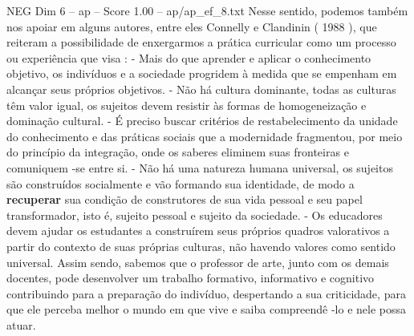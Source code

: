 \begin{textsample}{NEG Dim 6 – ap – Score 1.00 – ap/ap\_ef\_8.txt}
Nesse sentido, podemos também nos apoiar em alguns autores, entre eles Connelly e Clandinin ( 1988 ), que reiteram a possibilidade de enxergarmos a prática curricular como um processo ou experiência que visa : - Mais do que aprender e aplicar o conhecimento objetivo, os indivíduos e a sociedade progridem à medida que se empenham em alcançar seus próprios objetivos. - Não há cultura dominante, todas as culturas têm valor igual, os sujeitos devem resistir às formas de homogeneização e dominação cultural. - É preciso buscar critérios de restabelecimento da unidade do conhecimento e das práticas sociais que a modernidade fragmentou, por meio do princípio da integração, onde os saberes eliminem suas fronteiras e comuniquem -se entre si. - Não há uma natureza humana universal, os sujeitos são construídos socialmente e vão formando sua identidade, de modo a \textbf{recuperar} sua condição de construtores de sua vida pessoal e seu papel transformador, isto é, sujeito pessoal e sujeito da sociedade. - Os educadores devem ajudar os estudantes a construírem seus próprios quadros valorativos a partir do contexto de suas próprias culturas, não havendo valores como sentido universal.
Assim sendo, sabemos que o professor de arte, junto com os demais docentes, pode desenvolver um trabalho formativo, informativo e cognitivo contribuindo para a preparação do indivíduo, despertando a sua criticidade, para que ele perceba melhor o mundo em que vive e saiba compreendê -lo e nele possa atuar.

\end{textsample}
